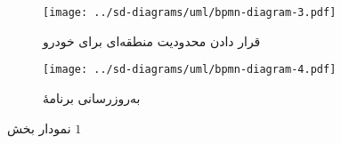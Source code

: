 \documentclass[a4paper,12pt]{report}
\begin{document}
	\begin{figure}[!ht]
		\centering
		\footnotesize
		\begin{subfigure}[t]{0.47\linewidth}
			\centering
			\texttt{[image: ../sd-diagrams/uml/bpmn-diagram-3.pdf]}
			\caption{
				قرار دادن محدودیت منطقه‌ای برای خودرو
			}
			\label{subfig1:fig6:sec5:chap2}
		\end{subfigure}
		\begin{subfigure}[t]{0.47\linewidth}
			\centering
			\texttt{[image: ../sd-diagrams/uml/bpmn-diagram-4.pdf]}
			\caption{
				به‌روزرسانی برنامهٔ
			}
			\label{subfig2:fig6:sec5:chap2}
		\end{subfigure}
		\hspace*{1cm}
		\normalsize
		\label{fig6:sec5:chap2}
		\caption{
			نمودار
			بخش
			$1$
		}
	\end{figure}

%
%
%
%
%


	\nocite{*}
	
	
\end{document}
